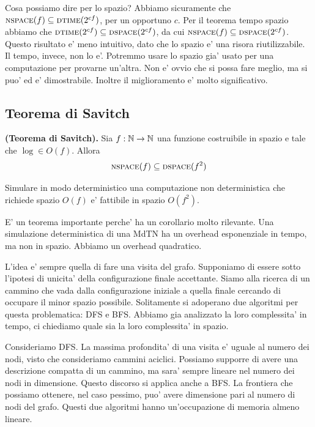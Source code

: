 Cosa possiamo dire per lo spazio? Abbiamo sicuramente che $\textsc{nspace}(f) \subseteq \textsc{dtime}(2^{cf})$, per
un opportuno $c$. Per il teorema tempo spazio abbiamo che $\textsc{dtime}(2^{cf}) \subseteq
\textsc{dspace}(2^{cf})$, da cui $\textsc{nspace}(f) \subseteq \textsc{dspace}(2^{cf})$. Questo risultato e' meno intuitivo,
dato che lo spazio e' una risora riutilizzabile. Il tempo, invece, non lo e'. Potremmo usare lo
spazio gia' usato per una computazione per provarne un'altra. Non e' ovvio che si possa fare meglio,
ma si puo' ed e' dimostrabile. Inoltre il miglioramento e' molto significativo.

\subsection{Teorema di Savitch}

\begin{thm}
    \textbf{(Teorema di Savitch).} Sia $f:\mathbb{N} \to \mathbb{N}$ una funzione costruibile in spazio e tale
    che $\log \in O(f)$. Allora
    \begin{equation*}
        \textsc{nspace}(f) \subseteq \textsc{dspace}(f^{2})
    \end{equation*}
\end{thm}

Simulare in modo deterministico una computazione non deterministica che richiede spazio $O(f)$ e'
fattibile in spazio $O(f^{2})$.

E' un teorema importante perche' ha un corollario molto rilevante. Una simulazione deterministica di
una MdTN ha un overhead esponenziale in tempo, ma non in spazio. Abbiamo un overhead quadratico.

L'idea e' sempre quella di fare una visita del grafo. Supponiamo di essere sotto l'ipotesi di
unicita' della configurazione finale accettante. Siamo alla ricerca di un cammino che vada dalla
configurazione iniziale a quella finale cercando di occupare il minor spazio possibile. Solitamente
si adoperano due algoritmi per questa problematica: DFS e BFS. Abbiamo gia analizzato la loro
complessita' in tempo, ci chiediamo quale sia la loro complessita' in spazio.

Consideriamo DFS. La massima profondita' di una visita e' uguale al numero dei nodi, visto che
consideriamo cammini aciclici. Possiamo supporre di avere una descrizione compatta di un cammino, ma
sara' sempre lineare nel numero dei nodi in dimensione. Questo discorso si applica anche a BFS. La
frontiera che possiamo ottenere, nel caso pessimo, puo' avere dimensione pari al numero di nodi del
grafo. Questi due algoritmi hanno un'occupazione di memoria almeno lineare.

